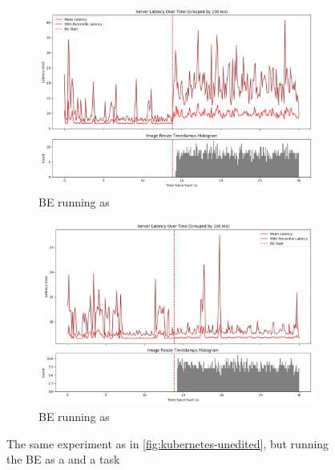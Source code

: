 \begin{figure}[t]
    \centering
    \begin{subfigure}[t]{0.49\columnwidth}
        \includegraphics[width=\columnwidth]{graphs/kubernetes-idle.png}
        \caption{BE running as \schedidle{}}\label{fig:kubernetes-idle}
    \end{subfigure}
    \hspace{\fill}
    \begin{subfigure}[t]{0.49\columnwidth}
        \includegraphics[width=\columnwidth]{graphs/kubernetes-schedbe.png}
        \caption{BE running as \schedbe{}}\label{fig:kubernetes-schedbe}
    \end{subfigure}
    \vspace{4pt}
    \caption{The same experiment as in \autoref{fig:kubernetes-unedited}, but
    running the BE as a \schedidle{} and a \schedbe{} task}\label{fig:kubernetes-other}
\end{figure}

